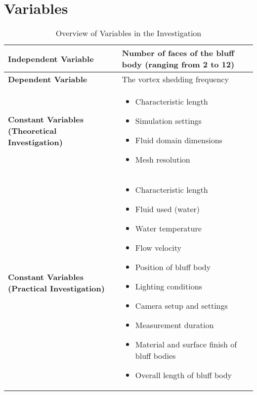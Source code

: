 \section{Variables}

\begin{table}[H]
	\centering
	\renewcommand{\arraystretch}{1.3}
	\begin{tabularx}{\textwidth}{|>{\raggedright\arraybackslash}p{5.2cm}|X|}
		\hline
		\textbf{Independent Variable} & Number of faces of the bluff body (ranging from 2 to 12) \\
		\hline
		\textbf{Dependent Variable} & The vortex shedding frequency \\
		\hline
		\textbf{Constant Variables (Theoretical Investigation)} &
		\begin{itemize}[leftmargin=1.5em, itemsep=2pt, topsep=0pt, label=--]
			\item Characteristic length
			\item Simulation settings
			\item Fluid domain dimensions
			\item Mesh resolution
		\end{itemize} \\
		\hline
		\textbf{Constant Variables (Practical Investigation)} &
		\begin{itemize}[leftmargin=1.5em, itemsep=2pt, topsep=0pt, label=--]
			\item Characteristic length
			\item Fluid used (water)
			\item Water temperature
			\item Flow velocity
			\item Position of bluff body
			\item Lighting conditions
			\item Camera setup and settings
			\item Measurement duration
			\item Material and surface finish of bluff bodies
			\item Overall length of bluff body
		\end{itemize} \\
		\hline
	\end{tabularx}
	\caption{Overview of Variables in the Investigation}
	\label{tab:variables}
\end{table}

